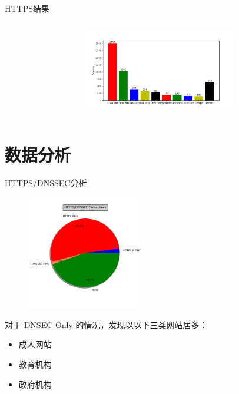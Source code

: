 \documentclass{beamer}
\begin{document}
\begin{frame}{HTTPS结果}
\begin{columns}
\begin{column}{0.5\textwidth}
  \end{column}
  \begin{column}{0.5\textwidth}
    \begin{figure}
      \includegraphics[height=3.5cm]{images/figure/certserver.png}
      \end{figure}
  \end{column}
  \end{columns}



    
  \end{frame}
\section{数据分析}
  \begin{frame}{HTTPS/DNSSEC分析}

  \begin{figure}
    \includegraphics[height=5cm,width=5cm]{images/figure/httpsdnssec.png}
  \end{figure}
  对于 DNSEC Only 的情况，发现以以下三类网站居多：
  \begin{itemize}
    \item 成人网站
    \item 教育机构
    \item 政府机构
  \end{itemize}
  \end{frame}
  
\end{document}
